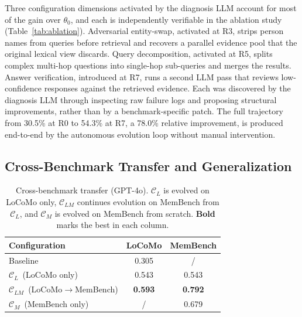 Three configuration dimensions activated by the diagnosis LLM account for most of the gain over $\theta_0$, and each is independently verifiable in the ablation study (Table~\ref{tab:ablation}). Adversarial entity-swap, activated at R3, strips person names from queries before retrieval and recovers a parallel evidence pool that the original lexical view discards. Query decomposition, activated at R5, splits complex multi-hop questions into single-hop sub-queries and merges the results. Answer verification, introduced at R7, runs a second LLM pass that reviews low-confidence responses against the retrieved evidence. Each was discovered by the diagnosis LLM through inspecting raw failure logs and proposing structural improvements, rather than by a benchmark-specific patch. The full trajectory from 30.5\% at R0 to 54.3\% at R7, a 78.0\% relative improvement, is produced end-to-end by the autonomous evolution loop without manual intervention.


\subsection{Cross-Benchmark Transfer and Generalization}
\label{app:transfer}

\begin{table}
\centering
\small
\vspace{-1.0em}
\caption{Cross-benchmark transfer (GPT-4o). $\mathcal{C}_L$ is evolved on LoCoMo only, $\mathcal{C}_{LM}$ continues evolution on MemBench from $\mathcal{C}_L$, and $\mathcal{C}_M$ is evolved on MemBench from scratch. \textbf{Bold} marks the best in each column.}
\label{tab:transfer}
\vspace{-0.4em}
\setlength{\tabcolsep}{4pt}
\begin{tabular}{@{}l c c@{}}
\toprule
\textbf{Configuration} & \textbf{LoCoMo} & \textbf{MemBench} \\
\midrule
Baseline & 0.305 & / \\
\addlinespace[2pt]
$\mathcal{C}_L$~{\scriptsize(LoCoMo only)} & 0.543 & 0.543 \\
$\mathcal{C}_{LM}$~{\scriptsize(LoCoMo$\to$MemBench)} & \textbf{0.593} & \textbf{0.792} \\
$\mathcal{C}_M$~{\scriptsize(MemBench only)} & / & 0.679 \\
\bottomrule
\end{tabular}
\vspace{-1.0em}
\end{table}

